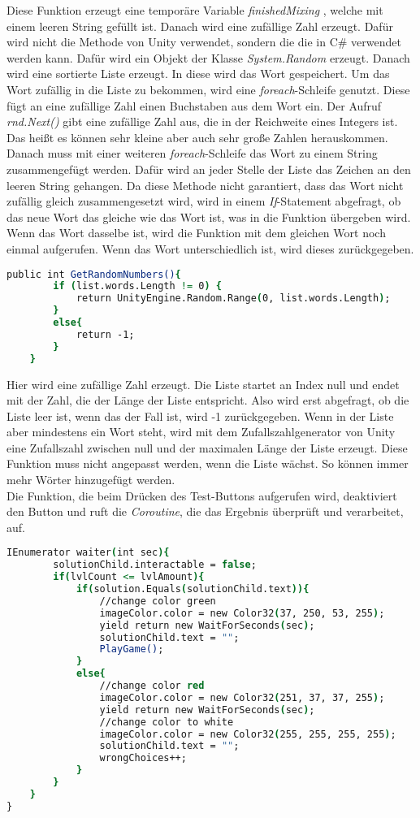 Diese Funktion erzeugt eine temporäre Variable \textit{finishedMixing} , welche mit einem leeren String gefüllt ist. Danach wird eine zufällige Zahl erzeugt. Dafür wird nicht die Methode von Unity verwendet, sondern die die in C\# verwendet werden kann. Dafür wird ein Objekt der Klasse \textit{System.Random} erzeugt. Danach wird eine sortierte Liste erzeugt. In diese wird das Wort gespeichert. Um das Wort zufällig in die Liste zu bekommen, wird eine \textit{foreach}-Schleife genutzt. Diese fügt an eine zufällige Zahl einen Buchstaben aus dem Wort ein. Der Aufruf \textit{rnd.Next()} gibt eine zufällige Zahl aus, die in der Reichweite eines Integers ist. Das heißt es können sehr kleine aber auch sehr große Zahlen herauskommen. Danach muss mit einer weiteren \textit{foreach}-Schleife das Wort zu einem String zusammengefügt werden. Dafür wird an jeder Stelle der Liste das Zeichen an den leeren String gehangen. Da diese Methode nicht garantiert, dass das Wort nicht zufällig gleich zusammengesetzt wird, wird in einem \textit{If}-Statement abgefragt, ob das neue Wort das gleiche wie das Wort ist, was in die Funktion übergeben wird. Wenn das Wort dasselbe ist, wird die Funktion mit dem gleichen Wort noch einmal aufgerufen. Wenn das Wort unterschiedlich ist, wird dieses zurückgegeben.\\
\begin{lstlisting}[language=csh, caption={WordMix.cs GetRandomNumbers-Funktion}]
	public int GetRandomNumbers(){
		if (list.words.Length != 0) {
			return UnityEngine.Random.Range(0, list.words.Length);
		}
		else{
			return -1;
		}
	}
\end{lstlisting}
Hier wird eine zufällige Zahl erzeugt. Die Liste startet an Index null und endet mit der Zahl, die der Länge der Liste entspricht. Also wird erst abgefragt, ob die Liste leer ist, wenn das der Fall ist, wird -1 zurückgegeben. Wenn in der Liste aber mindestens ein Wort steht, wird mit dem Zufallszahlgenerator von Unity eine Zufallszahl zwischen null und der maximalen Länge der Liste erzeugt. Diese Funktion muss nicht angepasst werden, wenn die Liste wächst. So können immer mehr Wörter hinzugefügt werden.\\
Die Funktion, die beim Drücken des Test-Buttons aufgerufen wird, deaktiviert den Button und ruft die \textit{Coroutine}, die das Ergebnis überprüft und verarbeitet, auf.\\
\begin{lstlisting}[language=csh, caption={WordMix.cs waiter-Funktion}]
	IEnumerator waiter(int sec){
		solutionChild.interactable = false;
		if(lvlCount <= lvlAmount){
			if(solution.Equals(solutionChild.text)){
				//change color green
				imageColor.color = new Color32(37, 250, 53, 255);
				yield return new WaitForSeconds(sec);
				solutionChild.text = "";
				PlayGame();
			}
			else{
				//change color red
				imageColor.color = new Color32(251, 37, 37, 255);
				yield return new WaitForSeconds(sec);
				//change color to white
				imageColor.color = new Color32(255, 255, 255, 255);
				solutionChild.text = "";
				wrongChoices++;
			}
		}
	}
}
\end{lstlisting}
